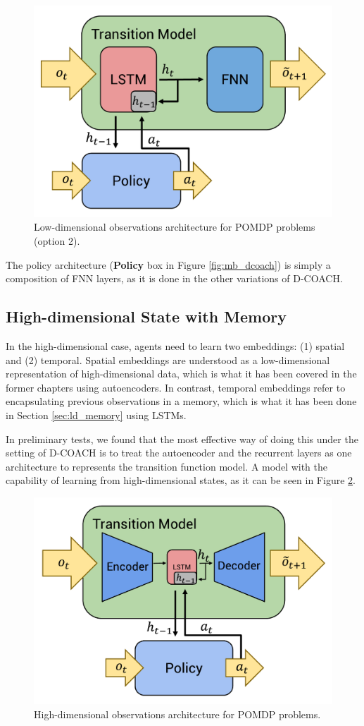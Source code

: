 \begin{figure}[h]
    \centering
    \includegraphics[width=0.7\linewidth]{imagenes/cap4/ld_model.pdf}
    \caption{Low-dimensional observations architecture for POMDP problems (option 2).}
    \label{fig:ld_model_win}
\end{figure}

The policy architecture (\textbf{Policy} box in Figure \ref{fig:mb_dcoach}) is simply a composition of FNN layers, as it is done in the other variations of D-COACH.

\subsection{High-dimensional State with Memory}
In the high-dimensional case, agents need to learn two embeddings: (1) spatial and (2) temporal. Spatial embeddings are understood as a low-dimensional representation of high-dimensional data, which is what it has been covered in the former chapters using autoencoders. In contrast, temporal embeddings refer to encapsulating previous observations in a memory, which is what it has been done in Section \ref{sec:ld_memory} using LSTMs. 

In preliminary tests, we found that the most effective way of doing this under the setting of D-COACH is to treat the autoencoder and the recurrent layers as one architecture to represents the transition function model. A model with the capability of learning from high-dimensional states, as it can be seen in Figure \ref{fig:rnn_hd}. 

\begin{figure}[h]
    \centering
    \includegraphics[width=0.8\linewidth]{imagenes/cap4/hd_model.pdf}
    \caption{High-dimensional observations architecture for POMDP problems.}
    \label{fig:rnn_hd}
\end{figure}


